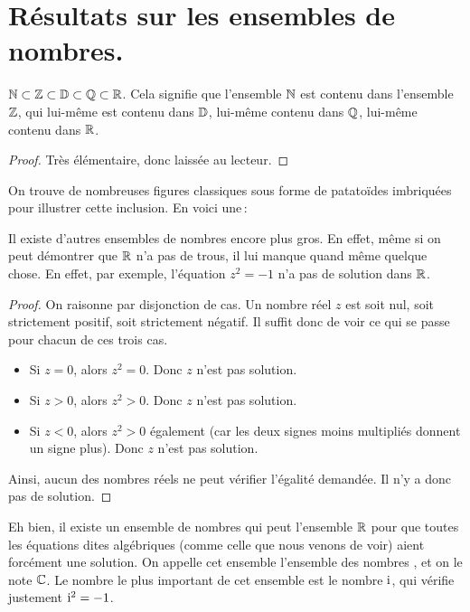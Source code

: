	\section{Résultats sur les ensembles de nombres.}

		\begin{thm}
			$\mathbb{N}\subset\mathbb{Z}\subset\mathbb{D}\subset\mathbb{Q}\subset\mathbb{R}$. Cela signifie que l'ensemble $\mathbb{N}$ est contenu dans l'ensemble $\mathbb{Z}$, qui lui-même est contenu dans $\mathbb{D}$, lui-même contenu dans $\mathbb{Q}$, lui-même contenu dans $\mathbb{R}$.
		\end{thm}
		\begin{proof}
			Très élémentaire, donc laissée au lecteur.
		\end{proof}

		On trouve de nombreuses figures classiques sous forme de patatoïdes imbriquées pour illustrer cette inclusion. En voici une\,:




		Il existe d'autres ensembles de nombres encore plus gros. En effet, même si on peut démontrer que $\mathbb{R}$ n'a pas de trous, il lui manque quand même quelque chose. En effet, par exemple, l'équation $z^2=-1$ n'a pas de solution dans $\mathbb{R}$.

		\begin{proof}
			On raisonne par disjonction de cas. Un nombre réel $z$ est soit nul, soit strictement positif, soit strictement négatif. Il suffit donc de voir ce qui se passe pour chacun de ces trois cas.
			\begin{itemize}[label=\textbullet]
				\item Si $z=0$, alors $z^2=0$. Donc $z$ n'est pas solution.
				\item Si $z>0$, alors $z^2>0$. Donc $z$ n'est pas solution.
				\item Si $z<0$, alors $z^2>0$ également (car les deux signes moins multipliés donnent un signe plus). Donc $z$ n'est pas solution.
			\end{itemize}
			Ainsi, aucun des nombres réels ne peut vérifier l'égalité demandée. Il n'y a donc pas de solution.
		\end{proof}

		Eh bien, il existe un ensemble de nombres qui peut  l'ensemble $\mathbb{R}$ pour que toutes les équations dites algébriques (comme celle que nous venons de voir) aient forcément une solution. On appelle cet ensemble l'ensemble des nombres , et on le note $\mathbb{C}$. Le nombre le plus important de cet ensemble est le nombre $\mathrm{i}$, qui vérifie justement $\mathrm{i}^2=-1$.

